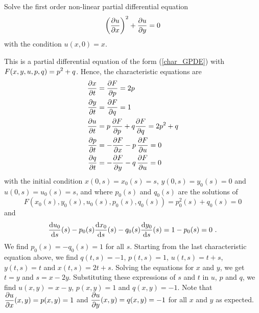 \begin{egg}
Solve the first order non-linear partial differential equation
\[
\left(\frac{\partial{u}}{\partial x}\right)^2 + \frac{\partial{u}}{\partial y} = 0
\]
with the condition $u(x,0)=x$.

This is a partial differential equation of the form (\ref{char_GPDE})
with $\displaystyle F(x,y,u,p,q)=p^2+q$.  Hence, the characteristic
equations are
\begin{align*}
\frac{\partial{x}}{\partial t} &= \frac{\partial{F}}{\partial p} = 2p \\
\frac{\partial{y}}{\partial t} &= \frac{\partial{F}}{\partial q} = 1 \\
\frac{\partial{u}}{\partial t} &= p\, \frac{\partial{F}}{\partial p} + q \frac{\partial{F}}{\partial q} = 2p^2 +q \\
\frac{\partial{p}}{\partial t} &= -\frac{\partial{F}}{\partial x} - p \, \frac{\partial{F}}{\partial u} = 0 \\
\frac{\partial{q}}{\partial t} &= -\frac{\partial{F}}{\partial y} - q \, \frac{\partial{F}}{\partial u} = 0
\end{align*}
with the initial condition $x(0,s) = x_0(s) = s$, $y(0,s) = y_0(s) = 0$
and $u(0,s) = u_0(s) = s$, and where $p_0(s)$ and
$q_0(s)$ are the solutions of
\[
F\left(x_0(s),y_0(s),u_0(s), p_0(s),q_0(s) \right) = p_0^2(s) + q_0(s) = 0
\]
and
\[
\frac{\mathrm{d}u_0}{\mathrm{d}{s}}(s) - p_0(s)\frac{\mathrm{d}x_0}{\mathrm{d}{s}}(s)- q_0(s)\frac{\mathrm{d}y_0}{\mathrm{d}{s}}(s)
= 1 - p_0(s) = 0 \ .
\]
We find $p_0(s) = - q_0(s) = 1$ for all $s$.  Starting from the last
characteristic equation above, we find
$q(t,s) = -1$, $p(t,s) = 1$, $u(t,s) = t + s$, $y(t,s) = t$ and
$x(t,s) = 2t + s$.  Solving the equations for $x$ and $y$, we get
$t=y$ and $s=x-2y$.  Substituting these expressions of $s$ and $t$ in
$u$, $p$ and $q$, we find $u(x,y) = x -y$, $p(x,y) = 1$ and $q(x,y) = -1$.
Note that $\displaystyle \frac{\partial{u}}{\partial x}(x,y) = p(x,y) = 1$ and 
$\displaystyle \frac{\partial{u}}{\partial y}(x,y) = q(x,y) = -1$ for all $x$ and $y$ as
expected.
\end{egg}

